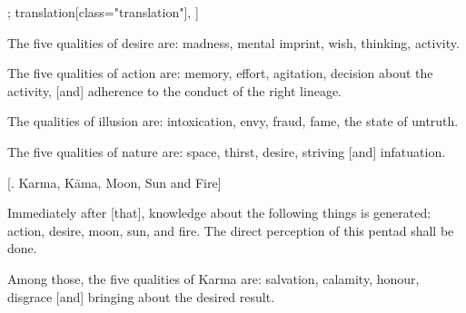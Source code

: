 \begin{alignment}[
  texts=edition[class="edition"];
  translation[class="translation"],
  ]
\begin{edition}
\begin{prose}
\dd{}
\dd{}
\dd{}
    \end{prose}
  \end{edition}
  \begin{translation}
    \begin{tlate}
The five qualities of desire are: madness, mental imprint, wish, thinking, activity.

The five qualities of action are: memory, effort, agitation, decision about the activity, [and] adherence to the conduct of the right lineage.

The qualities of illusion are: intoxication, envy, fraud, fame, the state of untruth.

The five qualities of nature are: space, thirst, desire, striving [and] infatuation.

\bigskip
 \centerline{\textrm{\small{[. Karma, Kāma, Moon, Sun and Fire]}}}
 \label{karmapentad}
\bigskip

Immediately after [that], knowledge about the following things is generated: action, desire, moon, sun, and fire. The direct perception of this pentad shall be done. 

Among those, the five qualities of Karma are: salvation, calamity, honour, disgrace [and] bringing about the desired result.
    \end{tlate}
  \end{translation}
\end{alignment}
\pagebreak %
